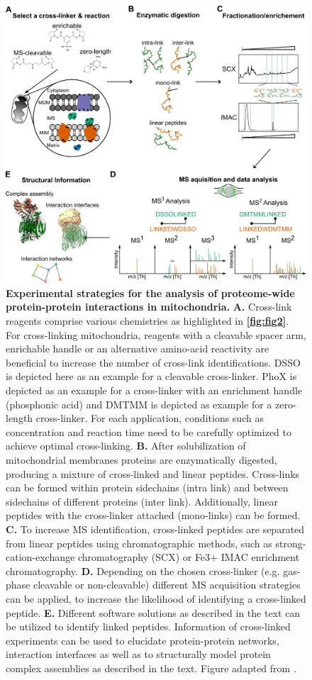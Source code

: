 \begin{figure}[hbt!]
    \center
    \includegraphics[width=0.95 \textwidth]{Chapter.1/Figures/Figure3.png} 
    \caption{\textbf{Experimental strategies for the analysis of proteome-wide protein-protein interactions in mitochondria.} \textbf{A.} Cross-link reagents comprise various chemistries as highlighted in \textbf{\autoref{fig:fig2}}. For cross-linking mitochondria, reagents with a cleavable spacer arm, enrichable handle or an alternative amino-acid reactivity are beneficial to increase the number of cross-link identifications. DSSO is depicted here as an example for a cleavable cross-linker. PhoX is depicted as an example for a cross-linker with an enrichment handle (phosphonic acid) and DMTMM is depicted as example for a zero-length cross-linker. For each application, conditions such as concentration and reaction time need to be carefully optimized to achieve optimal cross-linking. \textbf{B.} After solubilization of mitochondrial membranes proteins are enzymatically digested, producing a mixture of cross-linked and linear peptides. Cross-links can be formed within protein sidechains (intra link) and between sidechains of different proteins (inter link). Additionally, linear peptides with the cross-linker attached (mono-links) can be formed. \textbf{C.} To increase MS identification, cross-linked peptides are separated from linear peptides using chromatographic methods, such as strong-cation-exchange chromatography (SCX) or Fe3+ IMAC enrichment chromatography. \textbf{D.} Depending on the chosen cross-linker (e.g. gas-phase cleavable or non-cleavable) different MS acquisition strategies can be applied, to increase the likelihood of identifying a cross-linked peptide. \textbf{E.} Different software solutions as described in the text can be utilized to identify linked peptides. Information of cross-linked experiments can be used to elucidate protein-protein networks, interaction interfaces as well as to structurally model protein complex assemblies as described in the text. Figure adapted from \cite{Hevler_2021b}.}
    \label{fig:fig3}
\end{figure}

